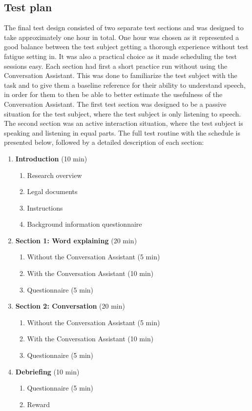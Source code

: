 \documentclass[english, 12pt, a4paper, pdftex, elec, utf8]{aaltothesis}
\begin{document}
\subsection{Test plan}

The final test design consisted of two separate test sections and was designed to take approximately one hour in total. One hour was chosen as it represented a good balance between the test subject getting a thorough experience without test fatigue setting in. It was also a practical choice as it made scheduling the test sessions easy. Each section had first a short practice run without using the Conversation Assistant. This was done to familiarize the test subject with the task and to give them a baseline reference for their ability to understand speech, in order for them to then be able to better estimate the usefulness of the Conversation Assistant. The first test section was designed to be a passive situation for the test subject, where the test subject is only listening to speech. The second section was an active interaction situation, where the test subject is speaking and listening in equal parts. The full test routine with the schedule is presented below, followed by a detailed description of each section: \\
\begin{enumerate}[font=\bfseries]
	\item \textbf{Introduction} (10 min)
	\begin{enumerate}[label*=\arabic*.]
		\item Research overview
		\item Legal documents
		\item Instructions
		\item Background information questionnaire
	\end{enumerate}
	\item \textbf{Section 1: Word explaining} (20 min)
	\begin{enumerate}[label*=\arabic*.]
		\item Without the Conversation Assistant (5 min)
		\item With the Conversation Assistant (10 min)
		\item Questionnaire (5 min)
	\end{enumerate}
	\item \textbf{Section 2: Conversation} (20 min)
	\begin{enumerate}[label*=\arabic*.]
		\item Without the Conversation Assistant (5 min)
		\item With the Conversation Assistant (10 min)
		\item Questionnaire (5 min)
	\end{enumerate}
	\item \textbf{Debriefing} (10 min)
	\begin{enumerate}[label*=\arabic*.]
		\item Questionnaire (5 min)
		\item Reward \\
	\end{enumerate}
\end{enumerate}
\end{document}
